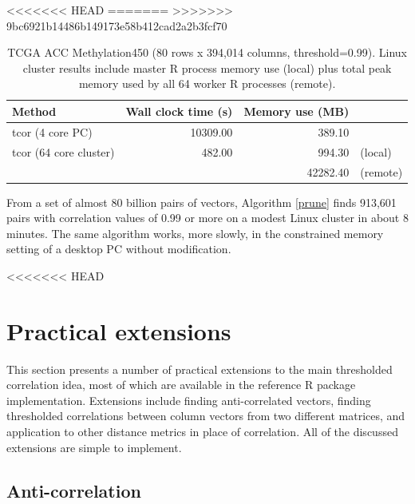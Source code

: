 \documentclass{article}
\numberwithin{algorithmctr}{section}
\begin{document}
<<<<<<< HEAD
=======
>>>>>>> 9bc6921b14486b149173e58b412cad2a2b3fcf70
\begin{table}[ht]
\centering
\begingroup\small
\begin{tabular}{lrrl}
  \hline
Method & Wall clock time (s) & Memory use (MB) &   \\ 
  \hline
tcor (4 core PC) & 10309.00 & 389.10 &  \\ 
  tcor (64 core cluster) & 482.00 & 994.30 & (local) \\ 
   &  & 42282.40 & (remote) \\ 
   \hline
\end{tabular}
\endgroup
\caption{TCGA ACC Methylation450 (80 rows x 394,014 columns, threshold=0.99). Linux cluster results include master R process memory use (local) plus total peak memory used by all 64 worker R processes (remote).} 
\label{TCGA3}
\end{table}From a set of almost 80 billion pairs of vectors, Algorithm \ref{prune} finds 913,601
pairs with correlation values of 0.99 or more on a modest Linux
cluster in about 8 minutes. The same algorithm works, more slowly, in
the constrained memory setting of a desktop PC without modification.

<<<<<<< HEAD


\section{Practical extensions}\label{extensions}

This section presents a number of practical extensions to the main thresholded
correlation idea, most of which are available in the reference R package
implementation. Extensions include finding anti-correlated vectors, finding
thresholded correlations between column vectors from two different matrices,
and application to other distance metrics in place of correlation. All of the
discussed extensions are simple to implement.


\subsection{Anti-correlation}
\end{document}
